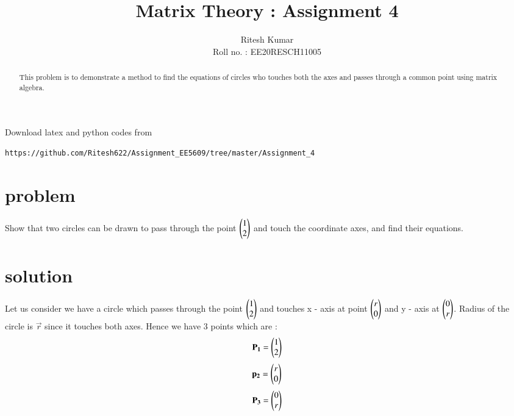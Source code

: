\documentclass[journal,12pt,twocolumn]{IEEEtran}
\begin{document}
     \def\rightbox#1{\makebox[0in][r]{#1}}
     \def\centbox#1{\makebox[0in]{#1}}
     \def\topbox#1{\raisebox{-\baselineskip}[0in][0in]{#1}}
     \def\midbox#1{\raisebox{-0.5\baselineskip}[0in][0in]{#1}}
\vspace{3cm}
\title{ Matrix Theory : Assignment 4 }
\author{Ritesh Kumar \\ Roll no. : EE20RESCH11005 }
\maketitle
\newpage
\bigskip
\renewcommand{\thefigure}{\theenumi}
\renewcommand{\thetable}{\theenumi}
\begin{abstract}
This problem is to demonstrate a method to find the equations of circles who touches both the axes and passes through a common point using matrix algebra.
\end{abstract}
Download latex and python codes from 
\begin{lstlisting}
https://github.com/Ritesh622/Assignment_EE5609/tree/master/Assignment_4
\end{lstlisting}

\section{problem}
Show that two circles can be drawn to pass through the point
 $ \begin{pmatrix} 1 \\ 2 \\	\end{pmatrix} $  and touch the coordinate axes, and find their equations.


\section{solution}
Let us consider  we have a circle which passes through the point   $ \begin{pmatrix} 1 \\ 2 \\	\end{pmatrix} $  and touches  x - axis at point  $ \begin{pmatrix} r \\ 0 \\	\end{pmatrix} $ and y - axis  at $ \begin{pmatrix} 0 \\ r \\ \end{pmatrix} $. Radius of the circle is $\vec{r}$ since it touches both axes. Hence we have 3 points which are :
\begin{align}
\mathbf{P_{1}} = \begin{pmatrix} 1 \\ 2 \\\end{pmatrix}
\end{align}
\begin{align}
\mathbf{p_{2}} = \begin{pmatrix} r \\ 0 \\\end{pmatrix}
\end{align}
\begin{align}
\mathbf{P_{3}} = \begin{pmatrix} 0 \\ r \\\end{pmatrix}
\end{align}
\end{document}
